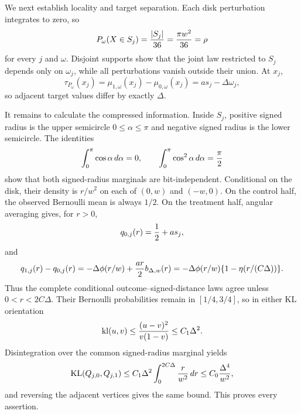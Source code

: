 We next establish locality and target separation.  Each disk perturbation integrates to zero, so
\[
 P_\omega(X\in S_j)={|S_j|\over36}={\pi w^2\over36}=\rho
\]
for every \(j\) and \(\omega\).  Disjoint supports show that the joint law restricted to \(S_j\) depends only on \(\omega_j\), while all perturbations vanish outside their union.  At \(x_j\),
\[
 \tau_{P_\omega}(x_j)=\mu_{1,\omega}(x_j)-\mu_{0,\omega}(x_j)=as_j-\Delta\omega_j,
\]
so adjacent target values differ by exactly \(\Delta\).

It remains to calculate the compressed information.  Inside \(S_j\), positive signed radius is the upper semicircle \(0\leq\alpha\leq\pi\) and negative signed radius is the lower semicircle.  The identities
\[
 \int_0^\pi\cos\alpha\,d\alpha=0,
 \qquad
 \int_0^\pi\cos^2\alpha\,d\alpha={\pi\over2}
\]
show that both signed-radius marginals are bit-independent.  Conditional on the disk, their density is \(r/w^2\) on each of \((0,w)\) and \((-w,0)\).  On the control half, the observed Bernoulli mean is always \(1/2\).  On the treatment half, angular averaging gives, for \(r>0\),
\[
 q_{0,j}(r)={1\over2}+as_j,
\]
and
\[
 q_{1,j}(r)-q_{0,j}(r)
 =-\Delta\phi(r/w)+{ar\over2}b_{\Delta,w}(r)
 =-\Delta\phi(r/w)\{1-\eta(r/(C\Delta))\}.
\]
Thus the complete conditional outcome--signed-distance laws agree unless \(0<r<2C\Delta\).  Their Bernoulli probabilities remain in \([1/4,3/4]\), so in either KL orientation
\[
 \operatorname{kl}(u,v)\leq { (u-v)^2\over v(1-v)}\leq C_1\Delta^2.
\]
Disintegration over the common signed-radius marginal yields
\[
 \operatorname{KL}(Q_{j,0},Q_{j,1})
 \leq C_1\Delta^2\int_0^{2C\Delta}{r\over w^2}\,dr
 \leq C_0{\Delta^4\over w^2},
\]
and reversing the adjacent vertices gives the same bound.  This proves every assertion.